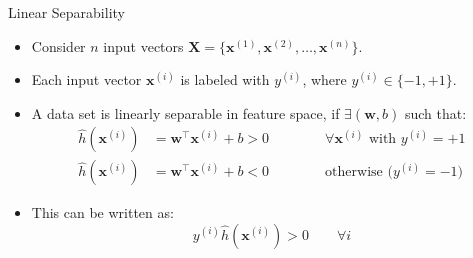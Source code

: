 \begin{dwHeaderFrame}{Linear Separability}
	\begin{itemize}
		\item Consider $n$ input vectors $\bm{X} = \{ \bm{x}^{(1)}, \bm{x}^{(2)}, \dots, \bm{x}^{(n)} \}$.
		\item Each input vector $\bm{x}^{(i)}$ is labeled with $y^{(i)}$, where $y^{(i)} \in \{ -1, +1 \}$.
		\item A data set is linearly separable in feature space, if $\exists (\bm{w}, b)$ such that:
		\begin{align}
			\widehat{h}(\bm{x}^{(i)}) &= \bm{w}^{\intercal} \bm{x}^{(i)} + b > 0
				\qquad\qquad  \text{$\forall \bm{x}^{(i)}$ with $y^{(i)} = +1$} \\[2mm]
			\widehat{h}(\bm{x}^{(i)}) &= \bm{w}^{\intercal} \bm{x}^{(i)} + b < 0
				\qquad\qquad \text{otherwise ($y^{(i)} = -1$)}
		\end{align}
		\item This can be written as:
		\begin{equation}
			y^{(i)} \widehat{h}(\bm{x}^{(i)}) > 0 \qquad \forall i
		\end{equation}
	\end{itemize}
\end{dwHeaderFrame}


\begin{dwHeaderFrame}{}
\end{dwHeaderFrame}


\makethanks


